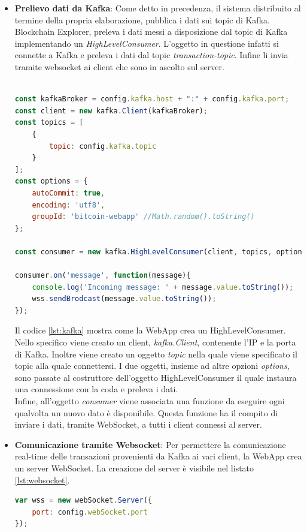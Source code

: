 \begin{itemize}
\item \textbf{Prelievo dati da Kafka}: Come detto in precedenza, il sistema distribuito al termine della propria elaborazione, pubblica i dati sui topic di Kafka. Blockchain Explorer, preleva i dati messi a disposizione dal topic di Kafka implementando un \textit{HighLevelConsumer}. L'oggetto in questione infatti si connette a Kafka e preleva i dati dal topic \textit{transaction-topic}. Infine li invia tramite websocket ai client che sono in ascolto sul server.
\begin{lstlisting}[language=Javascript, label=lst:kafka, caption={Creazione subscriber Kafka.}]

const kafkaBroker = config.kafka.host + ":" + config.kafka.port;
const client = new kafka.Client(kafkaBroker);
const topics = [
    {
        topic: config.kafka.topic
    }
];
const options = {
    autoCommit: true,
    encoding: 'utf8',
    groupId: 'bitcoin-webapp' //Math.random().toString()
};

const consumer = new kafka.HighLevelConsumer(client, topics, options);

consumer.on('message', function(message){
    console.log('Incoming message: ' + message.value.toString());
    wss.sendBrodcast(message.value.toString());
});
\end{lstlisting}

Il codice \ref{lst:kafka} mostra come la WebApp crea un HighLevelConsumer. Nello specifico viene creato un client, \textit{kafka.Client}, contenente l'IP e la porta di Kafka. Inoltre viene creato un oggetto \textit{topic} nella quale viene specificato il topic alla quale connettersi. I due oggetti, insieme ad altre opzioni \textit{options}, sono passate al costruttore dell'oggetto HighLevelConsumer il quale instaura una connessione con la coda e preleva i dati.
\\Infine, all'oggetto \textit{consumer} viene associata una funzione da eseguire ogni qualvolta un nuovo dato è disponibile. Questa funzione ha il compito di inviare i dati, tramite WebSocket, a tutti i client connessi al server.

\item \textbf{Comunicazione tramite Websocket}: Per permettere la comunicazione real-time delle transazioni provenienti da Kafka ai vari client, la WebApp crea un  server WebSocket. La creazione del server è visibile nel listato \ref{lst:websocket}.

\begin{lstlisting}[language=Javascript, label=lst:websocket, caption={Creazione di un Server WebSocket.}]
var wss = new webSocket.Server({
    port: config.webSocket.port
});



\end{lstlisting}
\end{itemize}
